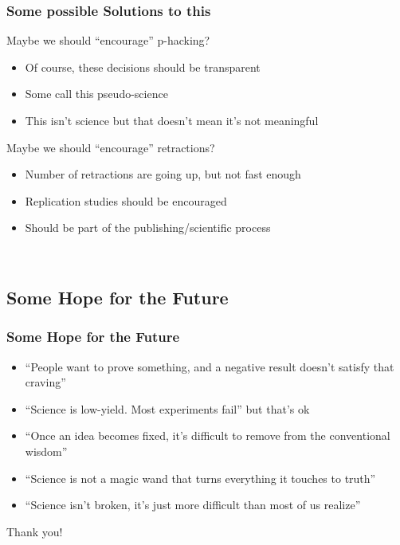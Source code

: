 \documentclass{beamer} %
\newcommand{\1}{\mathbb{1}}
\begin{document}
\begin{frame}[t]\frametitle{Some possible Solutions to this}

Maybe we should ``encourage'' p-hacking?
\begin{itemize}
	\item Of course, these decisions should be transparent
	\item Some call this pseudo-science
	\item This isn't science but that doesn't mean it's not meaningful 
\end{itemize}
\vspace{3mm}
\pause
Maybe we should ``encourage'' retractions?
\begin{itemize}
	\item Number of retractions are going up, but not fast enough
	\item Replication studies should be encouraged
	\item Should be part of the publishing/scientific process
\end{itemize}

\href{http://fivethirtyeight.com/features/science-isnt-broken/}
{}\\	
\end{frame}



\subsection{Some Hope for the Future}

\begin{frame}[t]\frametitle{Some Hope for the Future}

\begin{itemize}
	\item ``People want to prove something, and a negative result doesn’t satisfy that craving'' \pause
	\item ``Science is low-yield. Most experiments fail'' but that's ok \pause
	\item ``Once an idea becomes fixed, it’s difficult to remove from the conventional wisdom'' \pause
	\item ``Science is not a magic wand that turns everything it touches to truth'' \pause
	\item ``Science isn’t broken, it’s just more difficult than most of us realize'' \pause
\end{itemize}

\vspace{3mm}
\Large{Thank you!}

\end{frame}
\end{document}
